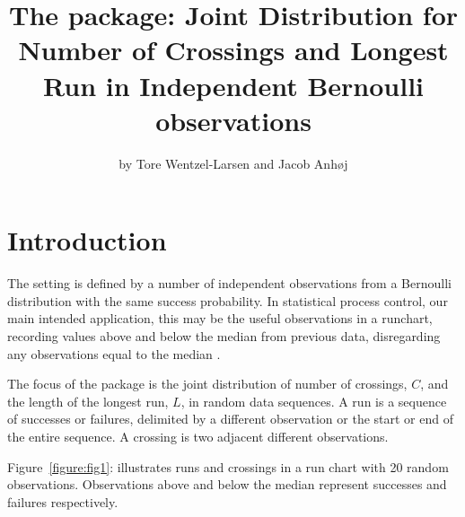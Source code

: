 \title{The  package: Joint Distribution for Number of Crossings and Longest Run in Independent Bernoulli observations}
\author{by Tore Wentzel-Larsen and Jacob Anh{\o}j}

\maketitle


\section{Introduction}

The setting is defined by a number of independent observations from a Bernoulli distribution with the same success probability. In statistical process control, our main intended application, this may be the useful observations in a runchart, recording values above and below the median from previous data, disregarding any observations equal to the median \citep{Anhoej:2015}. 

The focus of the  package is the joint distribution of number of crossings, $C$, and the length of the longest run, $L$, in random data sequences. A run is a sequence of successes or failures, delimited by a different observation or the start or end of the entire sequence. A crossing is two adjacent different observations. 

Figure~\ref{figure:fig1}: illustrates runs and crossings in a run chart with 20 random observations. Observations above and below the median represent successes and failures respectively.

